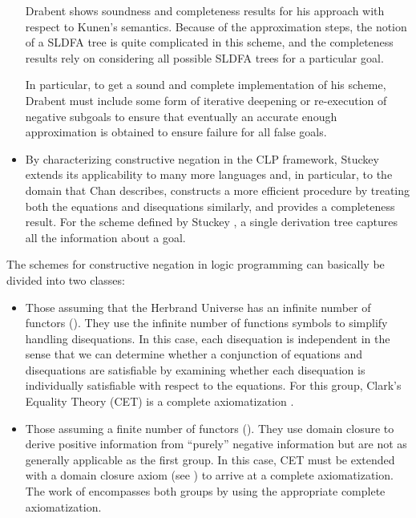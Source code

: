 \documentclass{tlp}
\begin{document}
\begin{itemize}
Drabent shows soundness and completeness results for his approach with
respect to Kunen's semantics. Because of the approximation steps, the
notion of a SLDFA tree is quite complicated in this scheme, and
the completeness results rely on considering all possible SLDFA trees
for a particular goal. 

In particular, to get a sound and complete
implementation of his scheme, Drabent must include some form of
iterative deepening or re-execution of negative subgoals to ensure
that eventually an accurate enough approximation is obtained to
ensure failure for all false goals.

\item By characterizing constructive negation in the CLP framework,
Stuckey \cite{Stuckey95} extends its applicability to many more
languages and, in particular, to the domain that Chan describes,
constructs a more efficient procedure by treating both the equations
and disequations similarly, and provides a completeness result. For
the scheme defined by Stuckey \cite{Stuckey95}, a single derivation
tree captures all the information about a goal.

\end{itemize}

The schemes for constructive negation in logic programming can
basically be divided into two classes:

\begin{itemize}

\item Those assuming that the Herbrand Universe has an infinite number
of functors (\cite{Chan1,Wallace,Sato91}). They use the infinite
number of functions symbols to simplify handling disequations. In this
case, each disequation is independent in the sense that we can
determine whether a conjunction of equations and disequations are
satisfiable by examining whether each disequation is individually
satisfiable with respect to the equations. For this group, Clark's
Equality Theory (CET) \cite{Clark} is a complete axiomatization
\cite{Maher}.

\item Those assuming a finite number of functors (\cite{Malus,Foo}).
They use domain closure to derive positive information from
``purely'' negative information but are not as generally applicable as
the first group. In this case, CET must be extended with a domain
closure axiom (see \cite{Maher}) to arrive at a complete
axiomatization. The work of \cite{Drabent} encompasses both groups by
using the appropriate complete axiomatization.
\end{itemize}
\end{document}
